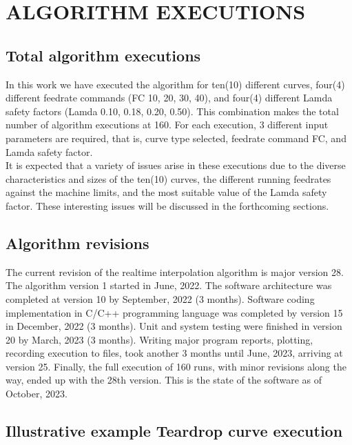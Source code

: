 \section{ALGORITHM EXECUTIONS}

\subsection{Total algorithm executions}

In this work we have executed the algorithm for ten(10) different curves, four(4) different feedrate commands (FC 10, 20, 30, 40), and four(4) different Lamda safety factors (Lamda 0.10, 0.18, 0.20, 0.50). This combination makes the total number of algorithm executions at 160. For each execution, 3 different input parameters are required, that is, curve type selected, feedrate command FC, and Lamda safety factor. \\

It is expected that a variety of issues arise in these executions due to the diverse characteristics and sizes of the ten(10) curves, the different running feedrates against the machine limits, and the most suitable value of the Lamda safety factor. These interesting issues will be discussed in the forthcoming sections.  

\subsection{Algorithm revisions}

The current revision of the realtime interpolation algorithm is major version 28. The algorithm version 1 started in June, 2022. The software architecture was completed at version 10 by September, 2022 (3 months). Software coding implementation in C/C++ programming language was completed by version 15 in December, 2022 (3 months). Unit and system testing were finished in version 20 by March, 2023 (3 months). Writing major program reports, plotting, recording execution to files, took another 3 months until June, 2023, arriving at version 25. Finally, the full execution of 160 runs, with minor revisions along the way, ended up with the 28th version. This is the state of the software as of October, 2023.     

\clearpage
\pagebreak

\subsection{Illustrative example Teardrop curve execution} \label{sec-Illustrative example Teardrop curve execution}

